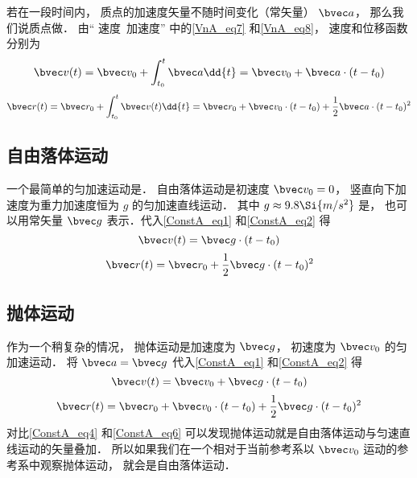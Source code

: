
若在一段时间内， 质点的加速度矢量不随时间变化（常矢量） $\bvec a$， 那么我们说质点做． 由“ 速度\ 加速度” 中的\autoref{VnA_eq7} 和\autoref{VnA_eq8}， 速度和位移函数分别为
\begin{equation}\label{ConstA_eq1}
\bvec v(t) = \bvec v_0 + \int_{t_0}^{t} \bvec a \dd{t} = \bvec v_0 + \bvec a \cdot (t-t_0)
\end{equation}
\begin{equation}\label{ConstA_eq2}
\bvec r(t) = \bvec r_0 + \int_{t_0}^{t} \bvec v(t) \dd{t} = \bvec r_0 + \bvec v_0\cdot (t-t_0) + \frac12 \bvec a\cdot (t-t_0)^2
\end{equation}


\subsection{自由落体运动}
一个最简单的匀加速运动是． 自由落体运动是初速度 $\bvec v_0 = 0$， 竖直向下加速度为重力加速度恒为 $g$ 的匀加速直线运动． 其中 $g\approx 9.8\Si{m/s^2}$ 是， 也可以用常矢量 $\bvec g$ 表示．代入\autoref{ConstA_eq1} 和\autoref{ConstA_eq2} 得
\begin{equation}\label{ConstA_eq3}
\bvec v(t) = \bvec g \cdot (t-t_0)
\end{equation}
\begin{equation}\label{ConstA_eq4}
\bvec r(t) = \bvec r_0 + \frac12 \bvec g \cdot (t-t_0)^2
\end{equation}

\subsection{抛体运动}
作为一个稍复杂的情况， 抛体运动是加速度为 $\bvec g$， 初速度为 $\bvec v_0$ 的匀加速运动． 将 $\bvec a = \bvec g$ 代入\autoref{ConstA_eq1} 和\autoref{ConstA_eq2} 得
\begin{equation}\label{ConstA_eq5}
\bvec v(t) = \bvec v_0 + \bvec g \cdot (t-t_0)
\end{equation}
\begin{equation}\label{ConstA_eq6}
\bvec r(t) = \bvec r_0 + \bvec v_0\cdot (t-t_0) + \frac12 \bvec g\cdot (t-t_0)^2
\end{equation}
对比\autoref{ConstA_eq4} 和\autoref{ConstA_eq6} 可以发现抛体运动就是自由落体运动与匀速直线运动的矢量叠加． 所以如果我们在一个相对于当前参考系以 $\bvec v_0$ 运动的参考系中观察抛体运动， 就会是自由落体运动．

